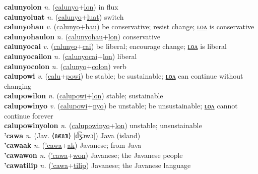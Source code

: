 \textbf{calunyolon} \textit{n.} (\hyperref[calunyo]{calunyo}+\hyperref[lon]{lon})
in flux \label{calunyolon} \\
\textbf{calunyoluat} \textit{n.} (\hyperref[calunyo]{calunyo}+\hyperref[luat]{luat})
switch \label{calunyoluat} \\
\textbf{calunyohau} \textit{v.} (\hyperref[calunyo]{calunyo}+\hyperref[hau]{hau})
be conservative; resist change; \hyperref[calunyohaulon]{ʟᴏᴧ} is conservative \label{calunyohau} \\
\textbf{calunyohaulon} \textit{n.} (\hyperref[calunyohau]{calunyohau}+\hyperref[lon]{lon})
conservative \label{calunyohaulon} \\
\textbf{calunyocai} \textit{v.} (\hyperref[calunyo]{calunyo}+\hyperref[cai]{cai})
be liberal; encourage change; \hyperref[calunyocailon]{ʟᴏᴧ} is liberal \label{calunyocai} \\
\textbf{calunyocailon} \textit{n.} (\hyperref[calunyocai]{calunyocai}+\hyperref[lon]{lon})
liberal \label{calunyocailon} \\
\textbf{calunyocolon} \textit{n.} (\hyperref[calunyo]{calunyo}+\hyperref[colon]{colon})
verb \label{calunyocolon} \\
\textbf{calupowi} \textit{v.} (\hyperref[calu]{calu}+\hyperref[powi]{powi})
be stable; be sustainable; \hyperref[calupowilon]{ʟᴏᴧ} can continue without changing \label{calupowi} \\
\textbf{calupowilon} \textit{n.} (\hyperref[calupowi]{calupowi}+\hyperref[lon]{lon})
stable; sustainable \label{calupowilon} \\
\textbf{calupowinyo} \textit{v.} (\hyperref[calupowi]{calupowi}+\hyperref[nyo]{nyo})
be unstable; be unsustainable; \hyperref[calupowinyolon]{ʟᴏᴧ} cannot continue forever \label{calupowinyo} \\
\textbf{calupowinyolon} \textit{n.} (\hyperref[calupowinyo]{calupowinyo}+\hyperref[lon]{lon})
unstable; unsustainable \label{calupowinyolon} \\
\textbf{'cawa} \textit{n.} (Jav. ⟨ꦗꦮ⟩ [d͡ʒɔwɔ])
Java (island) \label{'cawa} \\
\textbf{'cawaak} \textit{n.} (\hyperref['cawa]{'cawa}+\hyperref[ak]{ak})
Javanese; from Java \label{'cawaak} \\
\textbf{'cawawon} \textit{n.} (\hyperref['cawa]{'cawa}+\hyperref[won]{won})
Javanese; the Javanese people \label{'cawawon} \\
\textbf{'cawatilip} \textit{n.} (\hyperref['cawa]{'cawa}+\hyperref[tilip]{tilip})
Javanese; the Javanese language \label{'cawatilip} \\
